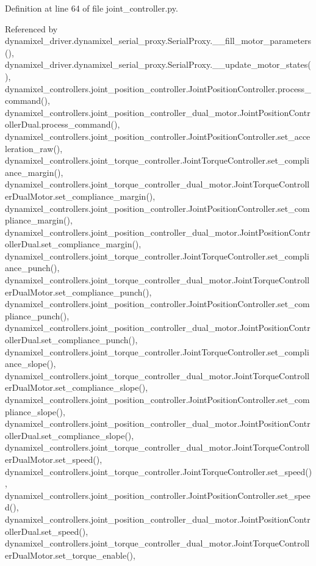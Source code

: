 Definition at line 64 of file joint\+\_\+controller.\+py.



Referenced by dynamixel\+\_\+driver.\+dynamixel\+\_\+serial\+\_\+proxy.\+Serial\+Proxy.\+\_\+\+\_\+fill\+\_\+motor\+\_\+parameters(), dynamixel\+\_\+driver.\+dynamixel\+\_\+serial\+\_\+proxy.\+Serial\+Proxy.\+\_\+\+\_\+update\+\_\+motor\+\_\+states(), dynamixel\+\_\+controllers.\+joint\+\_\+position\+\_\+controller.\+Joint\+Position\+Controller.\+process\+\_\+command(), dynamixel\+\_\+controllers.\+joint\+\_\+position\+\_\+controller\+\_\+dual\+\_\+motor.\+Joint\+Position\+Controller\+Dual.\+process\+\_\+command(), dynamixel\+\_\+controllers.\+joint\+\_\+position\+\_\+controller.\+Joint\+Position\+Controller.\+set\+\_\+acceleration\+\_\+raw(), dynamixel\+\_\+controllers.\+joint\+\_\+torque\+\_\+controller.\+Joint\+Torque\+Controller.\+set\+\_\+compliance\+\_\+margin(), dynamixel\+\_\+controllers.\+joint\+\_\+torque\+\_\+controller\+\_\+dual\+\_\+motor.\+Joint\+Torque\+Controller\+Dual\+Motor.\+set\+\_\+compliance\+\_\+margin(), dynamixel\+\_\+controllers.\+joint\+\_\+position\+\_\+controller.\+Joint\+Position\+Controller.\+set\+\_\+compliance\+\_\+margin(), dynamixel\+\_\+controllers.\+joint\+\_\+position\+\_\+controller\+\_\+dual\+\_\+motor.\+Joint\+Position\+Controller\+Dual.\+set\+\_\+compliance\+\_\+margin(), dynamixel\+\_\+controllers.\+joint\+\_\+torque\+\_\+controller.\+Joint\+Torque\+Controller.\+set\+\_\+compliance\+\_\+punch(), dynamixel\+\_\+controllers.\+joint\+\_\+torque\+\_\+controller\+\_\+dual\+\_\+motor.\+Joint\+Torque\+Controller\+Dual\+Motor.\+set\+\_\+compliance\+\_\+punch(), dynamixel\+\_\+controllers.\+joint\+\_\+position\+\_\+controller.\+Joint\+Position\+Controller.\+set\+\_\+compliance\+\_\+punch(), dynamixel\+\_\+controllers.\+joint\+\_\+position\+\_\+controller\+\_\+dual\+\_\+motor.\+Joint\+Position\+Controller\+Dual.\+set\+\_\+compliance\+\_\+punch(), dynamixel\+\_\+controllers.\+joint\+\_\+torque\+\_\+controller.\+Joint\+Torque\+Controller.\+set\+\_\+compliance\+\_\+slope(), dynamixel\+\_\+controllers.\+joint\+\_\+torque\+\_\+controller\+\_\+dual\+\_\+motor.\+Joint\+Torque\+Controller\+Dual\+Motor.\+set\+\_\+compliance\+\_\+slope(), dynamixel\+\_\+controllers.\+joint\+\_\+position\+\_\+controller.\+Joint\+Position\+Controller.\+set\+\_\+compliance\+\_\+slope(), dynamixel\+\_\+controllers.\+joint\+\_\+position\+\_\+controller\+\_\+dual\+\_\+motor.\+Joint\+Position\+Controller\+Dual.\+set\+\_\+compliance\+\_\+slope(), dynamixel\+\_\+controllers.\+joint\+\_\+torque\+\_\+controller\+\_\+dual\+\_\+motor.\+Joint\+Torque\+Controller\+Dual\+Motor.\+set\+\_\+speed(), dynamixel\+\_\+controllers.\+joint\+\_\+torque\+\_\+controller.\+Joint\+Torque\+Controller.\+set\+\_\+speed(), dynamixel\+\_\+controllers.\+joint\+\_\+position\+\_\+controller.\+Joint\+Position\+Controller.\+set\+\_\+speed(), dynamixel\+\_\+controllers.\+joint\+\_\+position\+\_\+controller\+\_\+dual\+\_\+motor.\+Joint\+Position\+Controller\+Dual.\+set\+\_\+speed(), dynamixel\+\_\+controllers.\+joint\+\_\+torque\+\_\+controller\+\_\+dual\+\_\+motor.\+Joint\+Torque\+Controller\+Dual\+Motor.\+set\+\_\+torque\+\_\+enable(), 